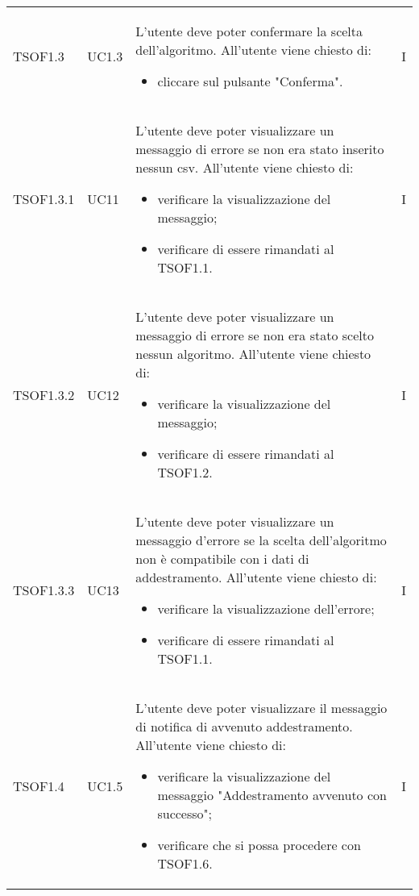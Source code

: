 \begin{longtable}{C{2.5cm} C{2.5cm} L{8cm} C{2cm}}
TSOF1.3 & UC1.3 & 
L'utente deve poter confermare la scelta dell'algoritmo. \newline All'utente viene chiesto di:
\begin{itemize}
	\item cliccare sul pulsante "Conferma".
\end{itemize} & I \\

TSOF1.3.1 & UC11 & 
L'utente deve poter visualizzare un messaggio di errore se non era stato inserito nessun csv. \newline All'utente viene chiesto di:
\begin{itemize}
	\item verificare la visualizzazione del messaggio;
	\item verificare di essere rimandati al TSOF1.1.
\end{itemize} & I \\

TSOF1.3.2 & UC12 & 
L'utente deve poter visualizzare un messaggio di errore se non era stato scelto nessun algoritmo. \newline All'utente viene chiesto di:
\begin{itemize}
	\item verificare la visualizzazione del messaggio;
	\item verificare di essere rimandati al TSOF1.2.
\end{itemize} & I \\

TSOF1.3.3 & UC13 & 
L'utente deve poter visualizzare un messaggio d'errore se la scelta dell'algoritmo non è compatibile con i dati di addestramento. \newline All'utente viene chiesto di:
\begin{itemize}
	\item verificare la visualizzazione dell'errore;
	\item verificare di essere rimandati al TSOF1.1.
\end{itemize} & I \\

TSOF1.4 & UC1.5 & 
L'utente deve poter visualizzare il messaggio di notifica di avvenuto addestramento. \newline All'utente viene chiesto di:
\begin{itemize}
	\item verificare la visualizzazione del messaggio "Addestramento avvenuto con successo";
	\item verificare che si possa procedere con TSOF1.6.
\end{itemize} & I \\


\end{longtable}

